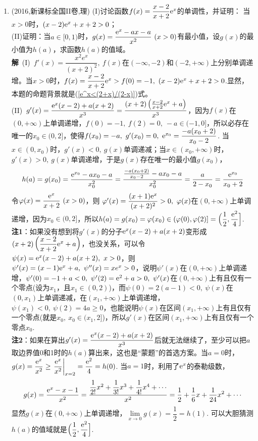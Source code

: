 \begin{enumerate}[label={【\textbf{例\thechapter.\arabic*}】},
 leftmargin=\inteval{\myenumleftmargin}pt,
 itemsep=\inteval{\myenumitempsep}pt,
 itemindent=\inteval{\myenumitemindent}pt]
\item (2016,新课标全国II卷,理) 
(I)讨论函数$ f(x)=\dfrac{x-2}{x+2}\mathrm{e}^x $的单调性，并证明：
当$ x>0 $时，$ (x-2)\mathrm{e}^x+x+2>0 $；\\
(II)证明：当$ a\in[0,1) $时，$ g(x)=\dfrac{\e^x-ax-a}{x^2}\ (x>0) $有最小值，设$ g(x) $的最小值为$ h(a) $，求函数$ h(a) $的值域。\\
\textbf{解}\ (I)\ $ f'(x)=\dfrac{x^2e^x}{(x+2)^2},\ f(x) $在$ (-\infty,-2) $和$ (-2,+\infty) $上分别单调递增。当$ x>0 $时，$ f(x)=\dfrac{x-2}{x+2}\e^x>f(0)=-1,\ (x-2)\e^x+x+2>0 $.显然，本题的命题背景就是(\ref{e^x<(2+x)/(2-x)})式。 \\
(II)\ $ g'(x)=\dfrac{\mathrm{e}^x(x-2)+a(x+2)}{x^3}=\dfrac{(x+2)
\left(\frac{x-2}{x+2}\mathrm{e}^x+a\right)}{x^3} $，因为$ f(x) $在$ (0,+\infty) $上单调递增，$ f(0)=-1,\ f(2)=0,\ -a\in(-1,0] $，所以必存在唯一的$ x_0\in(0,2] $，使得$ f(x_0)=-a,\ g'(x_0)=0,\ \e^{x_0}=\dfrac{-a(x_0+2)}{x_0-2} $. 当$ x\in(0,x_0) $时，$ g'(x)<0,\ g(x) $单调递减；当$ x\in(x_0,+\infty) $时，$ g'(x)>0,\ g(x) $单调递增，于是$ g(x) $存在唯一的最小值$ g(x_0) $，
\begin{gather*}
	h(a)=g(x_0)=\dfrac{\mathrm{e}^{x_0}-ax_0-a}{x_0^2}=
	\dfrac{\frac{-a(x_0+2)}{x_0-2}-ax_0-a}{x_0^2}=
	\dfrac{a}{2-x_0}=\dfrac{\mathrm{e}^{x_0}}{x_0+2}
\end{gather*}
令$ \varphi(x)=\dfrac{\e^{x}}{x+2}\ (x>0) $，则
$ \varphi'(x)=\dfrac{(x+1)\mathrm{e}^{x}}{(x+2)^2}>0,\  \varphi(x) $在$ (0,+\infty) $上单调递增，因为$ x_0\in(0,2] $，所以$ h(a)=g(x_0)=\varphi(x_0)\in(\varphi(0),\varphi(2)]=
\Big(\dfrac{1}{2},\dfrac{\mathrm{e}^2}{4}\Big] $.\\
\textbf{注1}：如果没有想到将$ g'(x) $的分子$ \mathrm{e}^x(x-2)+
a(x+2) $变形成$ (x+2)\left(\dfrac{x-2}{x+2}\mathrm{e}^x+a\right) $，也没关系，可以令$ \psi(x)=\mathrm{e}^x(x-2)+a(x+2),\ x>0 $，则$ \psi'(x)=(x-1)\e^x+a,\ \psi''(x)=xe^x>0 $，说明$ \psi'(x) $在$ (0,+\infty) $上单调递增，$ \psi'(0)=-1+a<0 ,\ \psi'(2)=\e^2+a>0,\ \psi'(x) $在$ (0,+\infty) $上有且仅有一个零点(设为$ x_1 $，且$ x_1\in(0,2) $)，而$ \psi(0)=2(a-1)<0,\ \psi(x) $在$ (0,x_1) $上单调递减，在$ (x_1,+\infty) $上单调递增，$ \psi(x_1)<0,\ \psi(2)=4a\geq 0 $，也能说明$ \psi(x) $在区间$ (x_1,+\infty) $上有且仅有一个零点(就是$ x_0,\ x_0\in(x_1,2] $)，所以$ g'(x) $在区间$ (x_1,+\infty) $上有且仅有一个零点$ x_0 $. \\
\textbf{注2}：如果在算出$ g'(x)=\dfrac{\mathrm{e}^x(x-2)+a(x+2)}
{x^3} $后就无法继续了，至少可以把$ a $取边界值0和1时的$ h(a) $算出来，这也是“蒙题”的首选方案。当$ a=0 $时，$ g(x)=\dfrac{\mathrm{e}^x}{x^2}\geq \left.\dfrac{\mathrm{e}^x}{x^2} \right|_{x=2} = \dfrac{\mathrm{e}^2}{4}=h(0) $. 当$ a=1 $时，利用了$ \mathrm{e}^x $的泰勒级数，
\begin{gather*}
  g(x)=\dfrac{\mathrm{e}^x-x-1}{x^2}=\dfrac{\dfrac{1}{2!}x^2+\dfrac{1}{3!}x^3+
 \dfrac{1}{4!}x^4+\cdots}{x^2}=\dfrac{1}{2}+\dfrac{1}{6}x+\dfrac{1}{24}x^2+\cdots
\end{gather*}
显然$ g(x) $在$ (0,+\infty) $上单调递增，$ \lim\limits_{x\to 0}g(x)=\dfrac{1}{2}=h(1) $. 可以大胆猜测$ h(a) $的值域就是$ \Big(\dfrac{1}{2},\dfrac{\mathrm{e}^2}{4}\Big] $. 


\end{enumerate}
